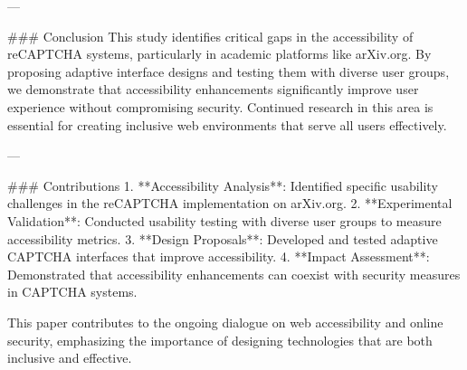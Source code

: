 ---

### Conclusion
This study identifies critical gaps in the accessibility of reCAPTCHA systems, particularly in academic platforms like arXiv.org. By proposing adaptive interface designs and testing them with diverse user groups, we demonstrate that accessibility enhancements significantly improve user experience without compromising security. Continued research in this area is essential for creating inclusive web environments that serve all users effectively.

---

### Contributions
1. **Accessibility Analysis**: Identified specific usability challenges in the reCAPTCHA implementation on arXiv.org.
2. **Experimental Validation**: Conducted usability testing with diverse user groups to measure accessibility metrics.
3. **Design Proposals**: Developed and tested adaptive CAPTCHA interfaces that improve accessibility.
4. **Impact Assessment**: Demonstrated that accessibility enhancements can coexist with security measures in CAPTCHA systems.

This paper contributes to the ongoing dialogue on web accessibility and online security, emphasizing the importance of designing technologies that are both inclusive and effective.
